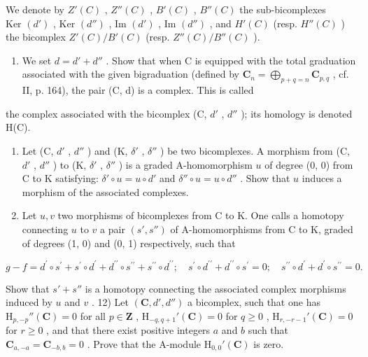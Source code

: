 We denote by \(Z'(C)\) , \(Z''(C)\) , \(B'(C)\) , \(B''(C)\) the sub-bicomplexes \(\text{Ker } (d')\) , \(\text{Ker } (d'')\) , \(\text{Im } (d')\) , \(\text{Im } (d'')\) , and \(H'(C)\) (resp. \(H''(C)\) ) the bicomplex \(Z'(C)/B'(C)\) (resp. \(Z''(C)/B''(C)\) ).

\begin{enumerate}
\def\labelenumi{\alph{enumi})}
\tightlist
\item
  We set \(d = d' + d''\) . Show that when C is equipped with the total graduation associated with the given bigraduation (defined by \(\mathbf{C}_n = \bigoplus_{p+q=n} \mathbf{C}_{p,q}\) , cf. II, p. 164), the pair (C, d) is a complex. This is called
\end{enumerate}

the complex associated with the bicomplex (C, \(d'\) , \(d''\) ); its homology is denoted H(C).

\begin{enumerate}
\def\labelenumi{\alph{enumi})}
\setcounter{enumi}{1}
\item
  Let (C, \(d'\) , \(d''\) ) and (K, \(\delta'\) , \(\delta''\) ) be two bicomplexes. A morphism from (C, \(d'\) , \(d''\) ) to (K, \(\delta'\) , \(\delta''\) ) is a graded A-homomorphism \(u\) of degree (0, 0) from C to K satisfying: \(\delta'\circ u = u \circ d'\) and \(\delta''\circ u = u \circ d''\) . Show that \(u\) induces a morphism of the associated complexes.
\item
  Let \(u, v\) two morphisms of bicomplexes from C to K. One calls a homotopy connecting \(u\) to \(v\) a pair \((s', s'')\) of A-homomorphisms from C to K, graded of degrees (1, 0) and (0, 1) respectively, such that
\end{enumerate}

\[
g - f = d ^ {\prime} \circ s ^ {\prime} + s ^ {\prime} \circ d ^ {\prime} + d ^ {\prime \prime} \circ s ^ {\prime \prime} + s ^ {\prime \prime} \circ d ^ {\prime \prime}; \quad s ^ {\prime} \circ d ^ {\prime \prime} + d ^ {\prime \prime} \circ s ^ {\prime} = 0; \quad s ^ {\prime \prime} \circ d ^ {\prime} + d ^ {\prime} \circ s ^ {\prime \prime} = 0.
\]

Show that \(s' + s''\) is a homotopy connecting the associated complex morphisms induced by \(u\) and \(v\) . 12) Let \((\mathbf{C}, d', d'')\) a bicomplex, such that one has \(\mathrm{H}_{p,-p}''(\mathbf{C}) = 0\) for all \(p \in \mathbf{Z}\) , \(\mathrm{H}_{-q,q+1}'(\mathbf{C}) = 0\) for \(q \geqslant 0\) , \(\mathrm{H}_{r,-r-1}'(\mathbf{C}) = 0\) for \(r \geqslant 0\) , and that there exist positive integers \(a\) and \(b\) such that \(\mathbf{C}_{a,-a} = \mathbf{C}_{-b,b} = 0\) . Prove that the A-module \(\mathrm{H}_{0,0}'(\mathbf{C})\) is zero.

